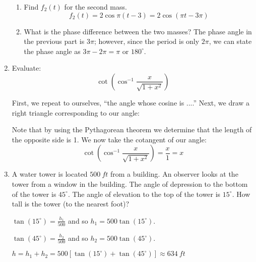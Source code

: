 \documentclass[letterpaper,12pt,fleqn]{article}
\renewcommand{\o}{\theta}
\begin{document}
\begin{enumerate}
\begin{enumerate}
  \item Find $f_2(t)$ for the second mass.
    \[f_2(t)=2\cos\pi(t-3)=2\cos(\pi t-3\pi)\]
    
  \item What is the phase difference between the two masses?
    The phase angle in the previous part is $3\pi$; however, since the period is
    only $2\pi$, we can state the phase angle as $3\pi-2\pi=\pi$ or
    $180^{\circ}$.
  \end{enumerate}

\item Evaluate:
  \[\cot\left(\cos^{-1}\frac{x}{\sqrt{1+x^2}}\right)\]

  First, we repeat to ourselves, ``the angle whose cosine is ....'' Next, we
  draw a right triangle corresponding to our angle:

  \begin{figure}[h]
  \setlength{\leftskip}{1in}
  \end{figure}

  Note that by using the Pythagorean theorem we determine that the length of
  the opposite side is 1.  We now take the cotangent of our angle:
  \[\cot\left(\cos^{-1}\frac{x}{\sqrt{1+x^2}}\right)=\frac{x}{1}=x\]

\item A water tower is located $\SI{500}{ft}$ from a building. An observer
  looks at the tower from a window in the building. The angle of depression
  to the bottom of the tower is $45^{\circ}$. The angle of elevation to the
  top of the tower is $15^{\circ}$. How tall is the tower (to the nearest foot)?

  \begin{center}
  \end{center}

  $\tan(15^{\circ})=\frac{h_1}{500}$ and so $h_1=500\tan(15^{\circ})$.

  $\tan(45^{\circ})=\frac{h_2}{500}$ and so $h_2=500\tan(45^{\circ})$.

  $h=h_1+h_2=500[\tan(15^{\circ})+\tan(45^{\circ})]\approx\SI{634}{ft}$
\end{enumerate}
 
\end{document}
